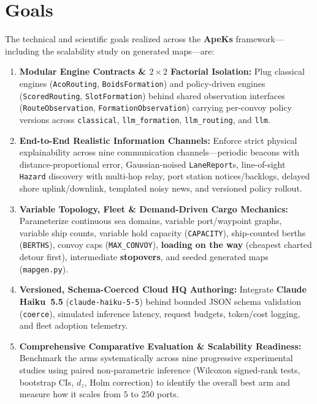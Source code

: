 \documentclass[11pt,a4paper,oneside]{report}
\begin{document}
\section{Goals}
The technical and scientific goals realized across the \textbf{ApeKs} framework---including the scalability study on generated maps---are:
\begin{sloppypar}
\begin{enumerate}
    \item \textbf{Modular Engine Contracts \& $2 \times 2$ Factorial Isolation:} Plug classical engines (\texttt{AcoRouting}, \texttt{BoidsFormation}) and policy-driven engines (\texttt{ScoredRouting}, \texttt{SlotFormation}) behind shared observation interfaces (\texttt{RouteObservation}, \texttt{FormationObservation}) carrying per-convoy policy versions across \texttt{classical}, \texttt{llm\_formation}, \texttt{llm\_routing}, and \texttt{llm}.
    \item \textbf{End-to-End Realistic Information Channels:} Enforce strict physical explainability across nine communication channels---periodic beacons with distance-proportional error, Gaussian-noised \texttt{LaneReport}s, line-of-sight \texttt{Hazard} discovery with multi-hop relay, port station notices/backlogs, delayed shore uplink/downlink, templated noisy news, and versioned policy rollout.
    \item \textbf{Variable Topology, Fleet \& Demand-Driven Cargo Mechanics:} Parameterize continuous sea domains, variable port/waypoint graphs, variable ship counts, variable hold capacity (\texttt{CAPACITY}), ship-counted berths (\texttt{BERTHS}), convoy caps (\texttt{MAX\_CONVOY}), \textbf{loading on the way} (cheapest charted detour first), intermediate \textbf{stopovers}, and seeded generated maps (\texttt{mapgen.py}).
    \item \textbf{Versioned, Schema-Coerced Cloud HQ Authoring:} Integrate \textbf{Claude Haiku~5.5} (\texttt{claude-haiku-5-5}) behind bounded JSON schema validation (\texttt{coerce}), simulated inference latency, request budgets, token/cost logging, and fleet adoption telemetry.
    \item \textbf{Comprehensive Comparative Evaluation \& Scalability Readiness:} Benchmark the arms systematically across nine progressive experimental studies using paired non-parametric inference (Wilcoxon signed-rank tests, bootstrap CIs, $d_z$, Holm correction) to identify the overall best arm and measure how it scales from $5$ to $250$ ports.
\end{enumerate}
\end{sloppypar}
\end{document}
